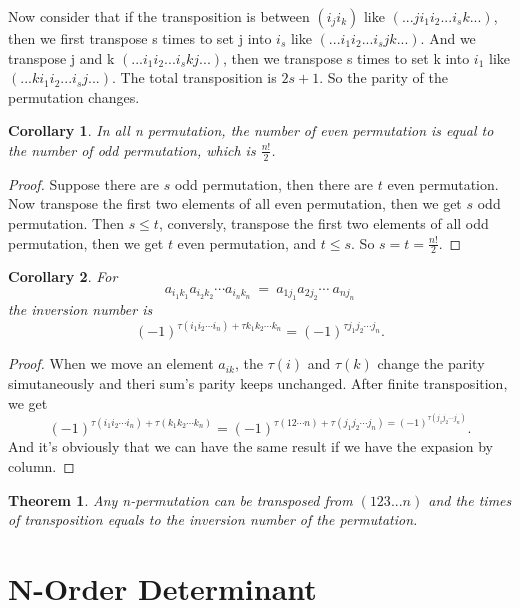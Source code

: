 \documentclass{article}
\newtheorem{theorem}{Theorem}[section]
\newtheorem{corollary}{Corollary}[theorem]
\theoremstyle{definition}
\begin{document}
Now consider that if the transposition is between $(i_{j}i_{k})$ like 
$(...ji_{1}i_{2}...i_{s}k...)$, 
then we first transpose s times to set j into $i_{s}$ like 
$(...i_{1}i_{2}...i_{s}jk...)$. 
And we transpose j and k 
$(...i_{1}i_{2}...i_{s}kj...)$, 
then we transpose s times to set k into $i_{1}$ like 
$(...ki_{1}i_{2}...i_{s}j...)$.
The total transposition is $2s+1$. 
So the parity of the permutation changes.

\begin{corollary}
In all n permutation, the number of even permutation 
is equal to the number of odd permutation, which is 
$\frac{n!}{2}$.
\end{corollary}

\begin{proof}
Suppose there are $s$ odd permutation, then there are
$t$ even permutation. Now transpose the first two elements 
of all even permutation, then we get $s$ odd permutation.
Then $s\leq t$, conversly, transpose the first two elements 
of all odd permutation, then we get $t$ even permutation, and 
$t\leq s$. So $s=t=\frac{n!}{2}$.
\end{proof}

\begin{corollary}
    For $$a_{i_{1}k_{1}}a_{i_{2}k_{2}}\cdots a_{i_{n}k_{n}}\ =\ a_{1j_{1}}a_{2j_{2}}\cdots\ a_{nj_{n}}$$
    the inversion number is 
    $$(-1)^{\tau(i_{1}i_{2}\cdots i_{n})+\tau k_{1}k_{2}\cdots k_{n}}=(-1)^{\tau j_{1}j_{2}\cdots j_{n}}.$$
\end{corollary}
\begin{proof}
    When we move an element $a_{ik}$, the $\tau(i)$ and $\tau(k)$ change the parity simutaneously and 
    theri sum's parity keeps unchanged.
    After finite transposition, we get 
    $$(-1)^{\tau(i_{1}i_{2}\cdots i_{n})+\tau (k_{1}k_{2}\cdots k_{n})}=(-1)^{\tau(12\cdots n)+\tau(j_{1}j_{2}\cdots j_{n})=(-1)^{\tau(j_{1}j_{2}\cdots j_{n})}}.$$
    And it's obviously that we can have the same result if we have the expasion by column.
\end{proof}


\begin{theorem}
Any n-permutation can be transposed from $(123...n)$ and the times 
of transposition equals to the inversion number of the permutation.

\end{theorem}

\section{N-Order Determinant}
\end{document}
